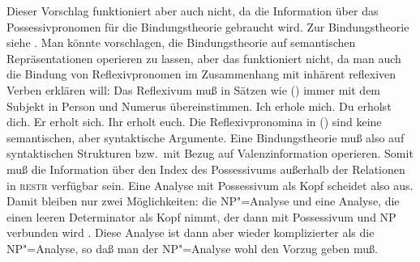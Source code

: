 \noindent
Dieser Vorschlag funktioniert aber auch nicht, da die Information über das Possessivpronomen
für die Bindungstheorie gebraucht wird. Zur Bindungstheorie siehe
. Man könnte vorschlagen, die Bindungstheorie auf semantischen Repräsentationen
operieren zu lassen, aber das funktioniert nicht, da man auch die Bindung von Reflexivpronomen
im Zusammenhang mit inhärent reflexiven Verben erklären will:
Das Reflexivum muß in Sätzen wie () immer mit dem Subjekt in Person und Numerus übereinstimmen.
\eal
\ex Ich erhole mich.
\ex Du erholst dich.
\ex Er erholt sich.
\ex Ihr erholt euch.
\zl
Die Reflexivpronomina in () sind keine semantischen, aber syntaktische Argumente.
Eine Bindungstheorie muß also auf syntaktischen Strukturen bzw.\ mit Bezug auf Valenzinformation
operieren. Somit muß die Information über den Index des Possessivums außerhalb der Relationen
in \textsc{restr} verfügbar sein. 
Eine Analyse mit Possessivum als Kopf scheidet also aus. Damit bleiben
nur zwei Möglichkeiten: die NP"=Analyse und eine Analyse, die einen leeren Determinator als Kopf
nimmt, der dann mit Possessivum und NP verbunden wird \citep[, ]{Abney87a}.
Diese Analyse ist dann aber wieder komplizierter
als die NP"=Analyse, so daß man der NP"=Analyse wohl den Vorzug geben muß.


